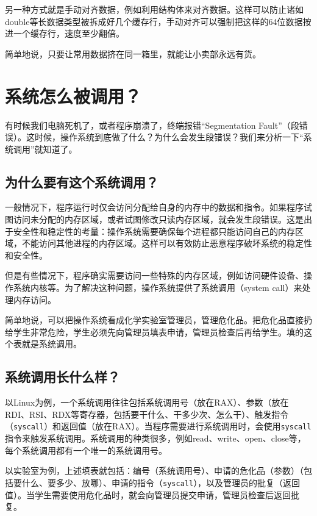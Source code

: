 另一种方式就是手动对齐数据，例如利用结构体来对齐数据。这样可以防止诸如double等长数据类型被拆成好几个缓存行，手动对齐可以强制把这样的64位数据按进一个缓存行，速度至少翻倍。

简单地说，只要让常用数据挤在同一箱里，就能让小卖部永远有货。

\section{系统怎么被调用？}

有时候我们电脑死机了，或者程序崩溃了，终端报错“Segmentation Fault”（段错误）。这时候，操作系统到底做了什么？为什么会发生段错误？我们来分析一下“系统调用”就知道了。

\subsection{为什么要有这个系统调用？}

一般情况下，程序运行时仅会访问分配给自身的内存中的数据和指令。如果程序试图访问未分配的内存区域，或者试图修改只读内存区域，就会发生段错误。这是出于安全性和稳定性的考量：操作系统需要确保每个进程都只能访问自己的内存区域，不能访问其他进程的内存区域。这样可以有效防止恶意程序破坏系统的稳定性和安全性。

但是有些情况下，程序确实需要访问一些特殊的内存区域，例如访问硬件设备、操作系统内核等。为了解决这种问题，操作系统提供了系统调用（system call）来处理内存访问。

简单地说，可以把操作系统看成化学实验室管理员，管理危化品。把危化品直接扔给学生非常危险，学生必须先向管理员填表申请，管理员检查后再给学生。填的这个表就是系统调用。

\subsection{系统调用长什么样？}

以Linux为例，一个系统调用往往包括系统调用号（放在RAX）、参数（放在RDI、RSI、RDX等寄存器，包括要干什么、干多少次、怎么干）、触发指令（\texttt{syscall}）和返回值（放在RAX）。当程序需要进行系统调用时，会使用\texttt{syscall}指令来触发系统调用。系统调用的种类很多，例如read、write、open、close等，每个系统调用都有一个唯一的系统调用号。

以实验室为例，上述填表就包括：编号（系统调用号）、申请的危化品（参数）（包括要什么、要多少、放哪）、申请的指令（\texttt{syscall}），以及管理员的批复（返回值）。当学生需要使用危化品时，就会向管理员提交申请，管理员检查后返回批复。

